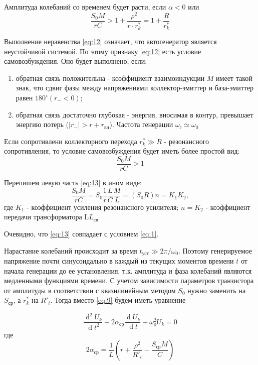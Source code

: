 Амплитуда колебаний со временем будет расти, если $\alpha<0$ или 
\begin{equation}
\frac{S_0M}{rC}>1+\frac{\rho^2}{r\cdot r_k^*}=1+\frac{R}{r_k^*}
\label{eq:12}
\end{equation}

Выполнение неравенства \eqref{eq:12} означает, что автогенератор является неустойчивой системой. По этому признаку \eqref{eq:12} есть условие самовозбуждения. Оно будет выполнено, если:
\begin{enumerate}
\item обратная связь положительна - коэффициент взаимоиндукции $M$ имеет такой знак, что сдвиг фазы между напряжениями коллектор-эмиттер и база-эмиттер равен $180^{\circ} (r_{-}<0)$;
\item обратная связь достаточно глубокая - энергия, вносимая в контур, превышает энергию потерь ($|r_{-}|>r+r_\text{вн}$). Частота генерации $\omega_\text{г}\simeq\omega_0$
\end{enumerate}

Если сопротивлени коллекторного перехода $r_k^*\gg R$ - резонансного сопротивления, то условие самовозбуждения будет иметь более простой вид:
\begin{equation}
\frac{S_0M}{rC}>1
\label{eq:13}
\end{equation}

Перепишем левую часть \eqref{eq:13} в ином виде:
\begin{equation*}
\frac{S_0M}{rC}=S_0\frac{1}{r}\frac{L}{C}\frac{M}{L}=(S_0R)n=K_1K_2,
\end{equation*}
где $K_1$ - коэффициент усиления резонансного усилителя; $n=K_2$ - коэффициент передачи трансформатора L\textdiv $L_\text{св}$

Очевидно, что \eqref{eq:13} совпадает с условием \eqref{eq:1}.

Нарастание колебаний происходит за время $t_\text{уст}\gg 2\pi / \omega_0$. Поэтому генерируемое напряжение почти синусоидально в каждый из текущих моментов времени $t$ от начала генерации до ее установления, т.к. амплитуда и фаза колебаний являются медленными функциями времени. С учетом зависимости параметров транзистора от амплитуды в соответствии с квазилинейным методом $S_0$ нужно заменить на $S_\text{ср}$, а $r_k^*$ на $R'_i$. Тогда вместо \eqref{eq:9} будем иметь уравнение 

\begin{equation}
\frac{\operatorname d^2U_k}{\operatorname dt^2}-2\alpha_\text{ср} \frac{\operatorname d U_k}{\operatorname dt}+\omega_0^2U_k=0
\label{eq:14}
\end{equation}
где 
\begin{equation}
2\alpha_\text{ср} = \frac{1}{L}(r+\frac{\rho^2}{R'_i}-\frac{S_\text{ср}M}{C})
\label{eq:15}
\end{equation}

